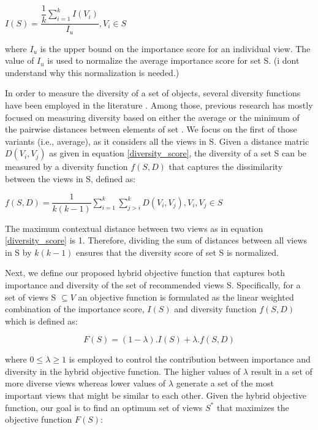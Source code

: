 {{\centerline{$ I\left(S\right)= \dfrac{\dfrac{1}{k} \sum_{i=1}^{k} I(V_i )}{I_u}, V_i  \in S $}
\bigskip

where $I_u$ is the upper bound on the importance score for an individual view. The value of $I_u$ is used to normalize the average importance score for set S. (i dont understand why this normalization is needed.)



In order to measure the diversity of a set of objects, several diversity functions have been employed in the literature \cite{Vieira2011, Clarke2008}. Among those, previous research has mostly focused on measuring diversity based on either the average or the minimum of the pairwise distances between elements of set \cite{Wu2014}. We focus on the first of those variants (i.e., average), as it considers all the views in S. Given a distance matric $ D\left(V_i, V_j\right) $ as given in equation \ref{diversity_score}, the diversity of a set S can be measured by a diversity function $ f\left(S,D\right) $ that captures the dissimilarity between the views in S, defined as:
\newline

$ f\left(S,D\right)= \dfrac{1}{k\left(k-1\right)}  \sum_{i=1}^{k} \sum_{j>i}^{k} D\left(V_i,V_j\right) ,V_i,V_j  \in S $
\newline

The maximum contextual distance between two views as in equation \ref{diversity_score}  is 1. Therefore, dividing the sum of distances between all views in S by $k\left(k-1\right)$ ensures that the diversity score of set S is normalized.

Next, we define our proposed hybrid objective function that captures both importance and diversity of the set of recommended views S. Specifically, for a set of views S $\subseteq V$ an objective function is formulated as the linear weighted combination of the importance score, $ I\left(S\right) $ and diversity function $ f\left(S,D\right) $ which is defined as:


\begin{equation}
F\left(S\right) =  \left(1-\lambda\right).I\left(S\right) + \lambda.f\left(S,D\right)
\label{objectif_function}
\end{equation}


where $ 0 \leq \lambda \geq 1 $ is employed to control the contribution between importance and diversity in the hybrid objective function. The higher values of $  \lambda $ result in a set of more diverse views whereas lower values of $ \lambda $ generate a set of the most important views that might be similar to each other. 
Given the hybrid objective function, our goal is to find an optimum set of views  $ S^* $ that maximizes the objective function $ F\left(S\right) $: 

}}
